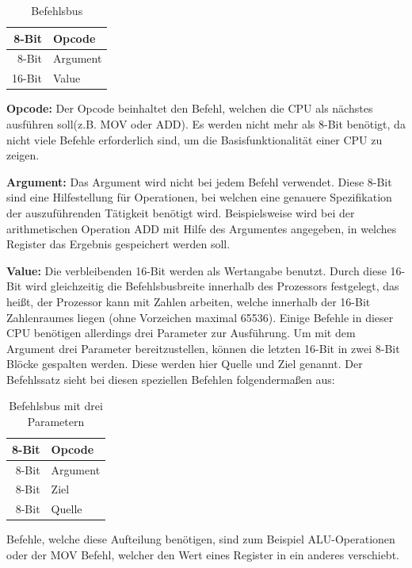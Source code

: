 \documentclass[a4paper,12pt]{article}
\begin{document}
\begin{table}[!htb]
\centering
\label{Befehlsbus}
\begin{tabular}{|r|l|}
  \hline
  8-Bit & Opcode \\
  \hline
  8-Bit & Argument \\ 
  \hline
  16-Bit & Value\\
  \hline
  
\end{tabular}
\caption{Befehlsbus}
\end{table}
\par\bigskip\noindent\textbf{Opcode: } Der Opcode beinhaltet den Befehl, welchen die CPU als nächstes ausführen soll(z.B. MOV oder ADD). Es werden nicht mehr als 8-Bit benötigt, da nicht viele Befehle erforderlich sind, um die Basisfunktionalität einer CPU zu zeigen.
\par\bigskip\noindent\textbf{Argument: } Das Argument wird nicht bei jedem Befehl verwendet. Diese 8-Bit sind eine Hilfestellung für Operationen, bei welchen eine genauere Spezifikation der auszuführenden Tätigkeit benötigt wird. Beispielsweise wird bei der arithmetischen Operation ADD mit Hilfe des Argumentes angegeben, in welches Register das Ergebnis gespeichert werden soll.
\par\bigskip\noindent\textbf{Value: } Die verbleibenden 16-Bit werden als Wertangabe benutzt. Durch diese 16-Bit wird gleichzeitig die Befehlsbusbreite innerhalb des Prozessors festgelegt, das heißt, der Prozessor kann mit Zahlen arbeiten, welche innerhalb der 16-Bit Zahlenraumes liegen (ohne Vorzeichen maximal 65536). Einige Befehle in dieser CPU benötigen allerdings drei Parameter zur Ausführung. Um mit dem Argument drei Parameter bereitzustellen, können die letzten 16-Bit in zwei 8-Bit Blöcke gespalten werden. Diese werden hier Quelle und Ziel genannt. Der Befehlssatz sieht bei diesen speziellen Befehlen folgendermaßen aus: 
\begin{table}[!htb]
\centering
\begin{tabular}{|r|l|}
  \hline
  8-Bit & Opcode \\
  \hline
  8-Bit & Argument \\ 
  \hline
  8-Bit & Ziel\\
  \hline
  8-Bit & Quelle\\
  \hline
\end{tabular}
\caption{Befehlsbus mit drei Parametern}
\label{Befehlsbus3P}
\end{table}
\newline
Befehle, welche diese Aufteilung benötigen, sind zum Beispiel ALU-Operationen oder der MOV Befehl, welcher den Wert eines Register in ein anderes verschiebt.
\end{document}

